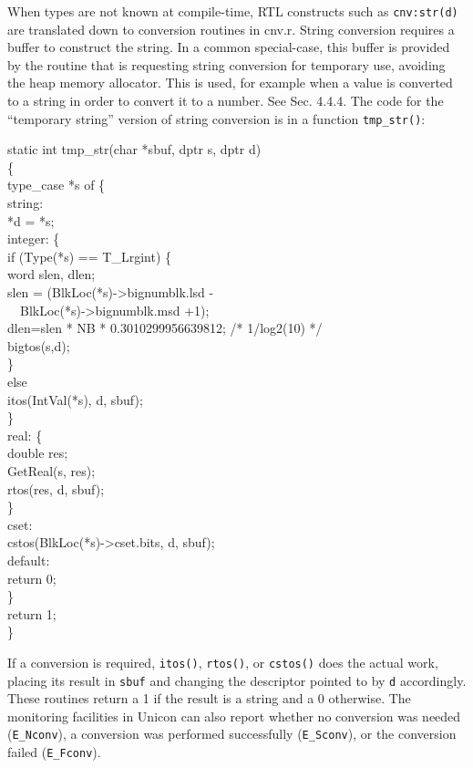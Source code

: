 When types are not known at compile-time, RTL constructs such as
\texttt{cnv:str(d)} are translated down to conversion routines in
cnv.r. String conversion requires a buffer to construct the string. In
a common special-case, this buffer is provided by the routine that is
requesting string conversion for temporary use, avoiding the heap
memory allocator.  This is used, for example when a value is converted
to a string in order to convert it to a number. See Sec. 4.4.4. The
code for the ``temporary string'' version of string conversion is in a
function \texttt{tmp\_str()}:

\begin{iconcode}
static int tmp\_str(char *sbuf, dptr s, dptr d)\\
\>\{\\
\>type\_case *s of \{\\
\>\>string:\\
\>\>\>*d = *s;\\
\>\>integer: \{\\
\>\>\>if (Type(*s) == T\_Lrgint) \{\\
\>\>\>\>word slen, dlen;\\
\>\>\>\>slen = (BlkLoc(*s)->bignumblk.lsd -\\
\>\>\>\>\>\>\ \ BlkLoc(*s)->bignumblk.msd +1);\\
\>\>\>\>dlen=slen * NB * 0.3010299956639812; /* 1/log2(10) */\\
\>\>\>\>bigtos(s,d);\\
\>\>\>\>\}\\
\>\>\>else\\
\>\>\>\>itos(IntVal(*s), d, sbuf);\\
\>\>\>\}\\
\>\>real: \{\\
\>\>\>double res;\\
\>\>\>GetReal(s, res);\\
\>\>\>rtos(res, d, sbuf);\\
\>\>\>\}\\
\>\>cset:\\
\>\>\>cstos(BlkLoc(*s)->cset.bits, d, sbuf);\\
\>\>default:\\
\>\>\>return 0;\\
\>\>\}\\
\>return 1;\\
\>\}
\end{iconcode}

If a conversion is required, \texttt{itos()}, \texttt{rtos()}, or
\texttt{cstos()} does the actual work, placing its result in \texttt{sbuf} and
changing the descriptor pointed to by \texttt{d} accordingly. These routines
return a 1 if the result is a string and a 0 otherwise. The monitoring
facilities in Unicon can also report whether no conversion was needed
(\texttt{E\_Nconv}), a conversion was performed successfully
(\texttt{E\_Sconv}), or the conversion failed (\texttt{E\_Fconv}).

